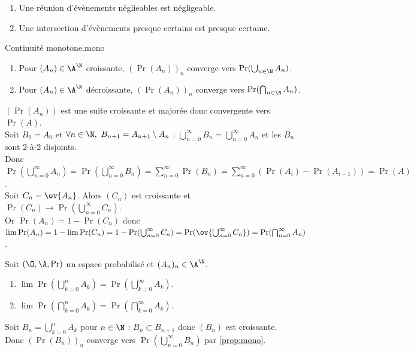 \documentclass[11pt]{article}
\begin{document}
\vspace*{-0.9cm}

\begin{corr}{}{}
    \begin{enumerate}
        \item Une réunion d'évènements néglieables est négligeable.
        \item Une intersection d'évènements presque certains est presque certaine.
    \end{enumerate}
\end{corr}

\vspace*{-0.9cm}

\begin{prop}{Continuité monotone.}{mono}
    \begin{enumerate}
        \item Pour $(A_n)\in\A^\N$ croissante, $(\Pr(A_n))_n$ converge vers $\Pr(\bigcup_{n\in\N}A_n)$.
        \item Pour $(A_n)\in\A^\N$ décroissante, $(\Pr(A_n))_n$ converge vers $\Pr(\bigcap_{n\in\N}A_n)$.
    \end{enumerate}
    \tcblower
     $(\Pr(A_n))$ est une suite croissante et majorée donc convergente vers $\Pr(A)$.\\
    Soit $B_0 = A_0$ et $\forall n \in \N, ~ B_{n+1}=A_{n+1}\setminus A_n$ : $\bigcup_{n=0}^{\infty}B_n = \bigcup_{n=0}^\infty A_n$ et les $B_n$ sont 2-à-2 disjoints.\\
    Donc $\Pr(\bigcup_{n=0}^\infty A_n)=\Pr(\bigcup_{n=0}^{\infty}B_n)=\sum_{n=0}^{\infty}\Pr(B_n)=\sum_{n=0}^{\infty}(\Pr(A_i)-\Pr(A_{i-1}))=\Pr(A)$.\\
     Soit $C_n=\ov{A_n}$. Alors $(C_n)$ est croissante et $\Pr(C_n)\to \Pr(\bigcup_{n=0}^\infty C_n)$.\\
    Or $\Pr(A_n)=1-\Pr(C_n)$ donc $\lim \Pr(A_n) = 1 - \lim \Pr(C_n) = 1 - \Pr(\bigcup_{n=0}^\infty C_n) = \Pr(\ov{\bigcup_{n=0}^\infty C_n})=\Pr(\bigcap_{n=0}^{\infty}A_n)$.
\end{prop}

\vspace*{-0.9cm}

\begin{corr}{}{}
    Soit $(\O,\A,\Pr)$ un espace probabilisé et $(A_n)_n\in\A^\N$.
    \begin{enumerate}
        \item $\lim \Pr(\bigcup_{k=0}^n A_k)=\Pr(\bigcup_{k=0}^\infty A_k)$.
        \item $\lim \Pr(\bigcap_{k=0}^n A_k) = \Pr(\bigcap_{k=0}^\infty A_k)$.
    \end{enumerate}
    \tcblower
     Soit $B_n = \bigcup_{k=0}^n A_k$ pour $n\in\N$ : $B_n\subset B_{n+1}$ donc $(B_n)$ est croissante.\\
    Donc $(\Pr(B_n))_n$ converge vers $\Pr(\bigcup_{n=0}^\infty B_n)$ par \ref{prop:mono}.
\end{corr}
\end{document}
